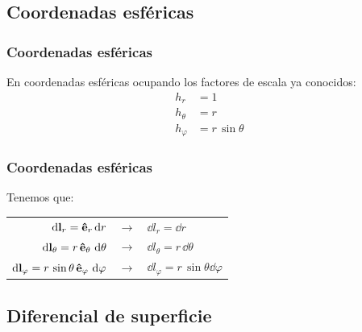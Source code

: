 \documentclass[12pt]{beamer}
\begin{document}
\subsection*{Coordenadas esféricas}

\begin{frame}
\frametitle{Coordenadas esféricas}
En coordenadas esféricas ocupando los factores de escala ya conocidos:
\pause
\begin{align*}
h_{r} & = 1 \\[0.5em]
h_{\theta} & = r \\[0.5em]
h_{\varphi} & = r \, \sin \theta
\end{align*}
\end{frame}
\begin{frame}
\frametitle{Coordenadas esféricas}
Tenemos que:
\pause
\begin{table}
\begin{tabular}{r  c  l}
$\dd{\vb{l}_{r}} = \vu{e}_{r} \dd{r}$ & $\longrightarrow$ & $\dd{l_{r}} = \dd{r}$ \\
$\dd{\vb{l}_{\theta}} = r \, \vu{e}_{\theta} \, \dd{\theta}$ & $\longrightarrow$ & $\dd{l_{\theta}} = r \, \dd{\theta}$ \\
$\dd{\vb{l}_{\varphi}} = r \, \sin \theta \, \vu{e}_{\varphi} \, \dd{\varphi}$ & $\longrightarrow$ & $\dd{l_{\varphi}} = r \, \sin \theta \dd{\varphi}$
\end{tabular}
\end{table}
\end{frame}

\subsection{Diferencial de superficie}
\end{document}
